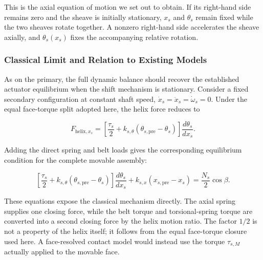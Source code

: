 \documentclass[11pt]{report}
\numberwithin{equation}{section}
\begin{document}
This is the axial equation of motion we set out to obtain. If its right-hand
side remains zero and the sheave is initially stationary, \(x_s\) and
\(\theta_s\) remain fixed while the two sheaves rotate together. A nonzero
right-hand side accelerates the sheave axially, and
\(\theta_s(x_s)\) fixes the accompanying relative rotation.

\subsubsection{Classical Limit and Relation to Existing Models}
\label{sec:secondary_classical_limit}

As on the primary, the full dynamic balance should recover the established
actuator equilibrium when the shift mechanism is stationary. Consider a fixed
secondary configuration at constant shaft speed,
\(\dot x_s=\ddot x_s=\dot\omega_s=0\). Under the equal face-torque split
adopted here, the helix force reduces to

\begin{equation}
    F_{\mathrm{helix},x_s}
    =
    \left[
        \frac{\tau_s}{2}
        +
        k_{s,\theta}
        \left(
            \theta_{s,\mathrm{pre}}-\theta_s
        \right)
    \right]
    \frac{d\theta_s}{dx_s}.
    \label{eq:secondary_helix_quasistatic_limit}
\end{equation}

Adding the direct spring and belt loads gives the corresponding equilibrium
condition for the complete movable assembly:

\begin{equation}
    \left[
        \frac{\tau_s}{2}
        +
        k_{s,\theta}
        \left(
            \theta_{s,\mathrm{pre}}-\theta_s
        \right)
    \right]
    \frac{d\theta_s}{dx_s}
    +
    k_{s,x}\left(x_{s,\mathrm{pre}}-x_s\right)
    =
    \frac{N_s}{2}\cos\beta.
    \label{eq:secondary_classical_equilibrium}
\end{equation}

These equations expose the classical mechanism directly. The axial spring
supplies one closing force, while the belt torque and torsional-spring torque
are converted into a second closing force by the helix motion ratio. The
factor \(1/2\) is not a property of the helix itself; it follows from the
equal face-torque closure used here. A face-resolved contact model would
instead use the torque \(\tau_{s,M}\) actually applied to the movable face.
\end{document}
